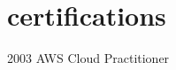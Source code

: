 \section{certifications}

\begin{entrylist}
	\certentry
	{2003}
	{AWS {\normalfont Cloud Practitioner}}
\end{entrylist}
